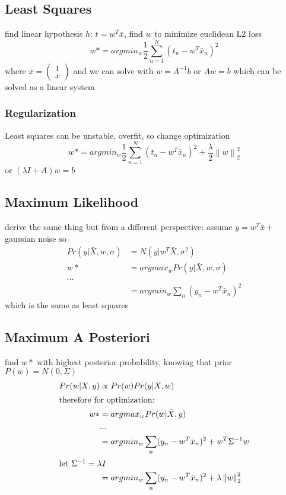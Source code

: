 \documentclass[]{article}
\theoremstyle{definition}
\newcommand\norm[1]{\left\lVert#1\right\rVert}
\begin{document}
\subsection{Least Squares}
\label{sub:introduction}

find linear hypothesis $h$: $t = w^T \bar x$, find $w$ to minimize euclidean L2 loss
\begin{equation*}
    w* = argmin_w \frac{1}{2} \sum_{n=1}^N (t_n - w^T \bar x_n)^2
\end{equation*}
where 
$ \bar x = \begin{pmatrix} 1 \\ x \end{pmatrix} $ and we can solve with $w = A^{-1} b$ or $Aw = b$ which can be solved as a linear system

    \subsubsection{Regularization}
    \label{ssub:Regularization}
    Least squares can be unstable, overfit, so change optimization
    \begin{equation*}
        w* = argmin_w \frac{1}{2} \sum_{n=1}^N (t_n - w^T \bar x_n)^2 + \frac{\lambda}{2} \norm{w}^2_2
    \end{equation*}
    or $(\lambda I + A)w = b$

    \subsection{Maximum Likelihood}
    \label{sub:maximum_likelihood}
    derive the same thing but from a different perspective: assume $y = w^T \bar x + $ gaussian noise so
    \begin{align*}
        Pr(y | \bar X, w, \sigma) &= N(y | w^T \bar X, \sigma^2) \\
        w* &= argmax_w Pr(y | \bar X, w, \sigma)  \\
        ... \\
        &= argmin_w \sum_n (y_n - w^T \bar x_n)^2 
    \end{align*}
    which is the same as least squares

    \subsection{Maximum A Posteriori}
    \label{sub:maximum_a_posteriori}

    find $w*$ with highest posterior probability, knowing that prior $P(w) = N(0, \Sigma)$
    \begin{align*}
        Pr(w|X,y) &\propto Pr(w) Pr(y | X, w) \\
        \intertext{therefore for optimization:}
        w* &= argmax_w Pr(w | \bar X, y) \\
           &... \\
           &= argmin_w \sum_n (y_n - w^T \bar x_n)^2 + w^T \Sigma^{-1} w \\
    \intertext{let $\Sigma^{-1} = \lambda I$}
    &= argmin_w \sum_n(y_n - w^T \bar x_n)^2 + \lambda \norm{w}^2_2 \\
\end{align*}
\end{document}
